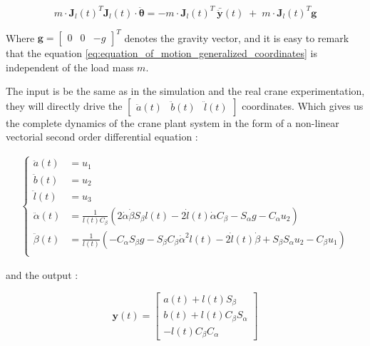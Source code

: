 \begin{equation}
\label{eq:equation_of_motion_generalized_coordinates}
    m \cdot \boldsymbol{J}_{l}(t)^T\boldsymbol{J}_{l}(t)\cdot \ddot{\boldsymbol{\theta}} = - m \cdot\boldsymbol{J}_{l}(t)^T \: \bar{\ddot{\boldsymbol{y}}}(t) \; + \; m \cdot \boldsymbol{J}_{l}(t)^T\boldsymbol{g}
\end{equation}

Where \(\boldsymbol{g} = \begin{bmatrix} 0 & 0 & -g\end{bmatrix}^T\) denotes the gravity vector, and it is easy to remark that the equation \ref{eq:equation_of_motion_generalized_coordinates} is independent of the load mass \(m\). 

The input is be the same as in the simulation and the real crane experimentation, they will directly drive the \(\begin{bmatrix}\ddot{a}(t) & \ddot{b}(t) & \ddot{l}(t)\end{bmatrix}\) coordinates. Which gives us the complete dynamics of the crane plant system in the form of a non-linear vectorial second order differential equation : 


\begin{align}
\left\{ \begin{array}{ll}
\ddot{a}(t) &= u_1\\ 
\ddot{b}(t) &= u_2\\ 
\ddot{l}(t) &= u_3\\
\ddot{\alpha}(t) &= \frac{1}{l(t) C_{\beta}} \left(2 \dot{\alpha} \dot{\beta} S_{\beta} l(t) - 2 \dot{l}(t) \dot{\alpha} C_{\beta} - S_{\alpha} g - C_{\alpha} u_2\right) \\
\ddot{\beta}(t) &= \frac{1}{l(t)} \left(-C_{\alpha} S_{\beta} g - S_{\beta} C_{\beta} \dot{\alpha}^2 l(t) - 2 \dot{l}(t) \dot{\beta} + S_{\beta} S_{\alpha} u_2 - C_{\beta} u_1\right) \\
\end{array}
\right.
\end{align}

and the output : 

\begin{equation}
    \textbf{y}(t) = \begin{bmatrix}
        a(t) + l(t)S_\beta \\
        b(t) + l(t)C_\beta S_\alpha \\
        -l(t)C_\beta C_\alpha
    \end{bmatrix}
\end{equation}

